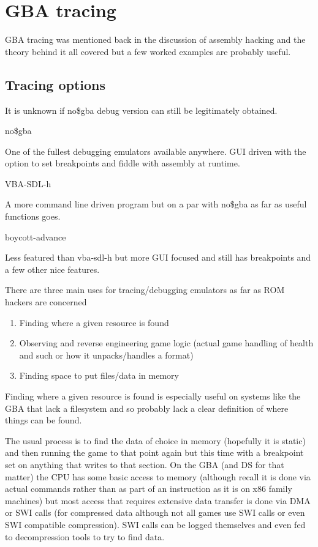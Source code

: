 \documentclass[
]{book}
\providecommand{\tightlist}{%
  \setlength{\itemsep}{0pt}\setlength{\parskip}{0pt}}
\begin{document}
\hypertarget{gba-tracing}{%
\chapter{GBA tracing}\label{gba-tracing}}

GBA tracing was mentioned back in the discussion of assembly hacking and the theory behind it all covered but a few worked examples are probably useful.

\hypertarget{tracing-options}{%
\section{Tracing options}\label{tracing-options}}

It is unknown if no\$gba debug version can still be legitimately obtained.

no\$gba

One of the fullest debugging emulators available anywhere. GUI driven with the option to set breakpoints and fiddle with assembly at runtime.

VBA-SDL-h

A more command line driven program but on a par with no\$gba as far as useful functions goes.

boycott-advance

Less featured than vba-sdl-h but more GUI focused and still has breakpoints and a few other nice features.

There are three main uses for tracing/debugging emulators as far as ROM hackers are concerned

\begin{enumerate}
\def\labelenumi{\arabic{enumi}.}
\tightlist
\item
  Finding where a given resource is found
\item
  Observing and reverse engineering game logic (actual game handling of health and such or how it unpacks/handles a format)
\item
  Finding space to put files/data in memory
\end{enumerate}

Finding where a given resource is found is especially useful on systems like the GBA that lack a filesystem and so probably lack a clear definition of where things can be found.

The usual process is to find the data of choice in memory (hopefully it is static) and then running the game to that point again but this time with a breakpoint set on anything that writes to that section. On the GBA (and DS for that matter) the CPU has some basic access to memory (although recall it is done via actual commands rather than as part of an instruction as it is on x86 family machines) but most access that requires extensive data transfer is done via DMA or SWI calls (for compressed data although not all games use SWI calls or even SWI compatible compression). SWI calls can be logged themselves and even fed to decompression tools to try to find data.
\end{document}
